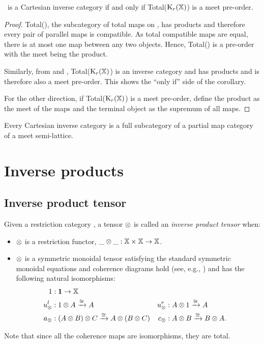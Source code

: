 \begin{corollary}
  \X\ is a Cartesian inverse category if and only if Total($\text{K}_{r}(\mathbb{X})$) is a meet pre-order.
\end{corollary}

\begin{proof}
  Total(\X), the subcategory of total maps on \X, has products and therefore every pair of parallel
  maps is compatible. As total compatible maps are equal, there is at most
  one map between any two objects. Hence, Total(\X) is a pre-order with the meet being the product.

  Similarly, from \cite{cockett2002:restcategories1} and \cite{cockettlack2004:restcategories3},
  Total($\text{K}_{r}(\mathbb{X})$) is an inverse category and has products and is therefore also a meet
  pre-order. This shows the ``only if'' side of the corollary.

  For the other direction, if Total($\text{K}_{r}(\mathbb{X})$) is a meet pre-order, define the product as the
  meet of the maps and the terminal object as the supremum of all maps.
\end{proof}

\begin{corollary}
  Every Cartesian inverse category is a full subcategory of a partial map category of a meet
  semi-lattice.
\end{corollary}


\section{Inverse products} %
\label{sec:inverse_products}

\subsection{Inverse product tensor} %
\label{sub:inverse_product_tensor}

\begin{definition}\label{def:inverse_product_tensor}
  Given a restriction category \X, a tensor $\otimes$ is called an \emph{inverse product tensor}
  when:
\begin{itemize}
  \item $\otimes$ is a restriction functor, $\_ \otimes \_ : \mathbb{X} \times \mathbb{X} \to \mathbb{X}$.
  \item $\otimes$ is a symmetric monoidal tensor satisfying the standard symmetric monoidal equations and
    coherence diagrams hold (see, e.g., \cite{maclan97:categorieswrkmath}) and has the following
    natural isomorphisms:
    \begin{align*}
      1 &: \boldsymbol{1}\to \mathbb{X} \\
      u_{\otimes}^l &: 1 \otimes A \xrightarrow{\cong} A
      &u_{\otimes}^r &: A \otimes 1 \xrightarrow{\cong} A\\
      a_{\otimes} &: (A \otimes B) \otimes C \xrightarrow{\cong} A \otimes (B \otimes C)
      &c_{\otimes} &: A \otimes B \xrightarrow{\cong} B \otimes A.
    \end{align*}
  \end{itemize}
  Note that since all the coherence maps are isomorphisms, they are total.
\end{definition}

